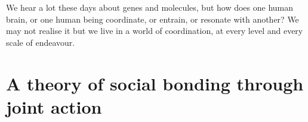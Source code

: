 
\begin{savequote}[8cm]

    We hear a lot these days about genes and molecules, but how does one human brain, or one human being coordinate, or entrain, or resonate with another?  We may not realise it but we live in a world of coordination, at every level and every scale of endeavour.

\end{savequote}




\chapter{\label{chap:theory}A theory of social bonding through joint action}


\minitoc


